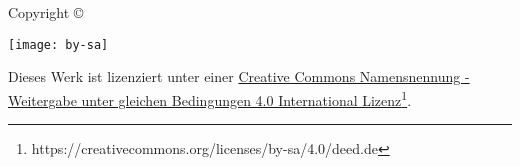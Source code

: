 \null
\vfill
\makeatletter
\begin{flushleft}
	Copyright \copyright \ \the\year{} \ \@author\par
	\vspace{5mm}
	\texttt{[image: by-sa]}\par
	\vspace{5mm}
	Dieses Werk ist lizenziert unter einer \href{https://creativecommons.org/licenses/by-sa/4.0/deed.de}{Creative Commons Namensnennung - Weitergabe unter gleichen Bedingungen 4.0 International Lizenz}\footnote{https://creativecommons.org/licenses/by-sa/4.0/deed.de}.
\end{flushleft}
\makeatother
